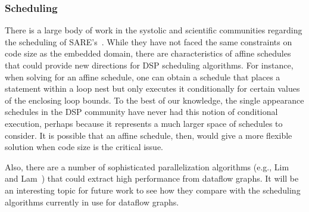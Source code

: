 \subsubsection{Scheduling}

There is a large body of work in the systolic and scientific
communities regarding the scheduling of SARE's~\cite{DRV00}.  While
they have not faced the same constraints on code size as the embedded
domain, there are characteristics of affine schedules that could
provide new directions for DSP scheduling algorithms.  For instance,
when solving for an affine schedule, one can obtain a schedule that
places a statement within a loop nest but only executes it
conditionally for certain values of the enclosing loop bounds.  To the
best of our knowledge, the single appearance schedules in the DSP
community have never had this notion of conditional execution, perhaps
because it represents a much larger space of schedules to consider.
It is possible that an affine schedule, then, would give a more
flexible solution when code size is the critical issue.

Also, there are a number of sophisticated parallelization algorithms
(e.g., Lim and Lam~\cite{Lim01}) that could extract high performance
from dataflow graphs.  It will be an interesting topic for future work
to see how they compare with the scheduling algorithms currently in
use for dataflow graphs.







